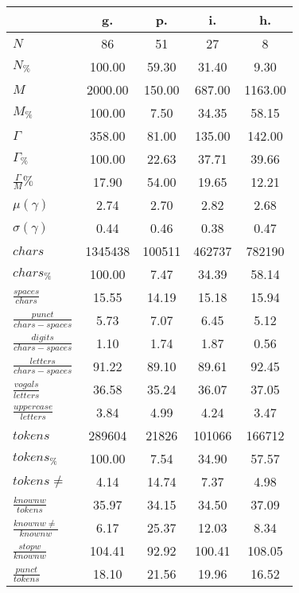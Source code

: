 \begin{table}[h!]
\begin{center}
\begin{tabular}{| l || c | c | c | c |}\hline
 & {\bf g.} & {\bf p.} & {\bf i.} & {\bf h.} \\\hline\hline
$N$ & 86  & 51  & 27  & 8 \\
$N_{\%}$ & 100.00  & 59.30  & 31.40  & 9.30 \\\hline
$M$ & 2000.00  & 150.00  & 687.00  & 1163.00 \\
$M_{\%}$ & 100.00  & 7.50  & 34.35  & 58.15 \\\hline
$\Gamma$ & 358.00  & 81.00  & 135.00  & 142.00 \\
$\Gamma_{\%}$ & 100.00  & 22.63  & 37.71  & 39.66 \\\hline
$\frac{\Gamma}{M}\%$ & 17.90  & 54.00  & 19.65  & 12.21 \\
$\mu(\gamma)$ & 2.74  & 2.70  & 2.82  & 2.68 \\
$\sigma(\gamma)$ & 0.44  & 0.46  & 0.38  & 0.47 \\\hline\hline
$chars$ & 1345438  & 100511  & 462737  & 782190 \\
$chars_{\%}$ & 100.00  & 7.47  & 34.39  & 58.14 \\\hline
$\frac{spaces}{chars}$ & 15.55  & 14.19  & 15.18  & 15.94 \\
$\frac{punct}{chars-spaces}$ & 5.73  & 7.07  & 6.45  & 5.12 \\
$\frac{digits}{chars-spaces}$ & 1.10  & 1.74  & 1.87  & 0.56 \\\hline
$\frac{letters}{chars-spaces}$ & 91.22  & 89.10  & 89.61  & 92.45 \\
$\frac{vogals}{letters}$ & 36.58  & 35.24  & 36.07  & 37.05 \\
$\frac{uppercase}{letters}$ & 3.84  & 4.99  & 4.24  & 3.47 \\\hline\hline
$tokens$ & 289604  & 21826  & 101066  & 166712 \\
$tokens_{\%}$ & 100.00  & 7.54  & 34.90  & 57.57 \\
$tokens \neq$ & 4.14  & 14.74  & 7.37  & 4.98 \\\hline
$\frac{knownw}{tokens}$ & 35.97  & 34.15  & 34.50  & 37.09 \\
$\frac{knownw \neq}{knownw}$ & 6.17  & 25.37  & 12.03  & 8.34 \\\hline
$\frac{stopw}{knownw}$ & 104.41  & 92.92  & 100.41  & 108.05 \\
$\frac{punct}{tokens}$ & 18.10  & 21.56  & 19.96  & 16.52 \\

\end{tabular}
\end{center}
\end{table}

